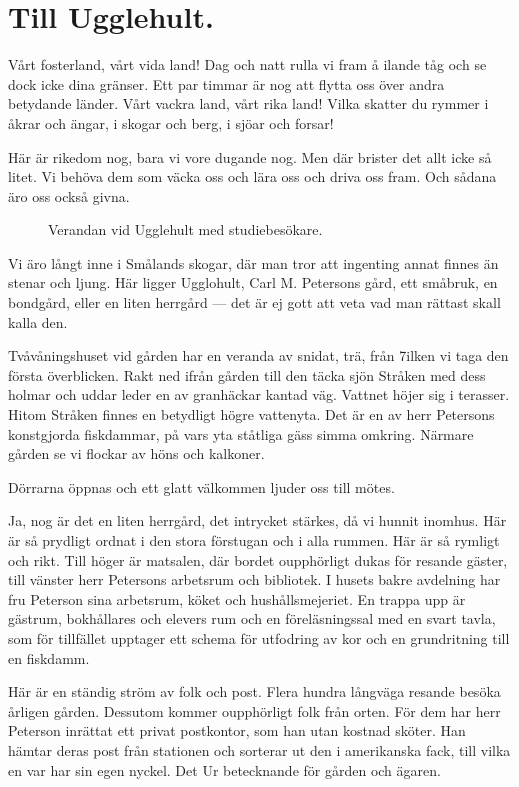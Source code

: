 \chapter{Till Ugglehult.}

Vårt fosterland, vårt vida land! Dag och natt rulla vi
fram å ilande tåg och se dock icke dina gränser. Ett par timmar
är nog att flytta oss över andra betydande länder. Vårt vackra
land, vårt rika land! Vilka skatter du rymmer i åkrar och ängar,
i skogar och berg, i sjöar och forsar!

Här är rikedom nog, bara vi vore dugande nog. Men där
brister det allt icke så litet. Vi behöva dem som väcka oss och
lära oss och driva oss fram. Och sådana äro oss också givna.

\begin{figure}[H]
    \centering
    
    \caption{Verandan vid Ugglehult med studiebesökare.}
\end{figure}

Vi äro långt inne i Smålands skogar, där man tror att
ingenting annat finnes än stenar och ljung. Här ligger Ugglohult,
Carl M. Petersons gård, ett småbruk, en bondgård, eller en liten
herrgård — det är ej gott att veta vad man rättast skall kalla den.

Tvåvåningshuset vid gården har en veranda av snidat, trä,
från 7ilken vi taga den första överblicken. Rakt ned ifrån gården
till den täcka sjön Stråken med dess holmar och uddar leder en
av granhäckar kantad väg. Vattnet höjer sig i terasser. Hitom
Stråken finnes en betydligt högre vattenyta. Det är en av herr
Petersons konstgjorda fiskdammar, på vars yta ståtliga gäss
simma omkring. Närmare gården se vi flockar av höns och kalkoner.

Dörrarna öppnas och ett glatt välkommen ljuder oss till
mötes.

Ja, nog är det en liten herrgård, det intrycket stärkes, då vi
hunnit inomhus. Här är så prydligt ordnat i den stora förstugan
och i alla rummen. Här är så rymligt och rikt. Till höger är
matsalen, där bordet oupphörligt dukas för resande gäster, till
vänster herr Petersons arbetsrum och bibliotek. I husets bakre
avdelning har fru Peterson sina arbetsrum, köket och
hushållsmejeriet. En trappa upp är gästrum, bokhållares och elevers rum
och en föreläsningssal med en svart tavla, som för tillfället upptager
ett schema för utfodring av kor och en grundritning till en fiskdamm.

Här är en ständig ström av folk och post. Flera hundra
långväga resande besöka årligen gården. Dessutom kommer
oupphörligt folk från orten. För dem har herr Peterson inrättat ett
privat postkontor, som han utan kostnad sköter. Han hämtar
deras post från stationen och sorterar ut den i amerikanska fack,
till vilka en var har sin egen nyckel. Det Ur betecknande för
gården och ägaren.

